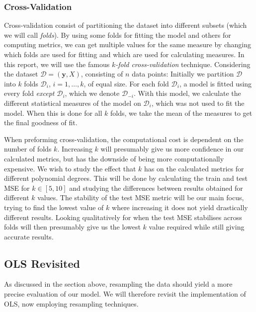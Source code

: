 \documentclass[twocolumn,english,notitlepage]{article}
\renewcommand{\vec}[1]{\boldsymbol{#1}}
\begin{document}
        \subsubsection{Cross-Validation}
            Cross-validation consist of partitioning the dataset into different subsets (which we will call \textit{folds}). By using some folds for fitting the model and others for computing metrics, we can get multiple values for the same measure by changing which folds are used for fitting and which are used for calculating measures. 
            \newline\newline
            In this report, we will use the famous \textit{$k$-fold cross-validation} technique. Considering the dataset $\mathcal{D} = (\vec{y}, X)$, consisting of $n$ data points: Initially we partition $\mathcal{D}$ into $k$ folds $\mathcal{D}_i$, $i = 1, \ldots , k$, of equal size. For each fold $\mathcal{D}_i$, a model is fitted using every fold \textit{except} $\mathcal{D}_i$, which we denote $\mathcal{D}_{-i}$. With this model, we calculate the different statistical measures of the model on $\mathcal{D}_i$, which was not used to fit the model. When this is done for all $k$ folds, we take the mean of the measures to get the final goodness of fit. 

            When preforming cross-validation, the computational cost is dependent on the number of folds $k$. Increasing $k$ will presumably give us more confidence in our calculated metrics, but has the downside of being more computationally expensive. We wish to study the effect that $k$ has on the calculated metrics for different polynomial degrees. This will be done by calculating the train and test MSE for $k \in [5,10]$ and studying the differences between results obtained for different  $k$ values. The stability of the test MSE metric will be our main focus, trying to find the lowest value of $k$ where increasing it does not yield drastically different results. Looking qualitatively for when the test MSE stabilises across folds will then presumably give us the lowest $k$ value required while still giving accurate results.

    \subsection{OLS Revisited}
        As discussed in the section above, resampling the data should yield a more precise evaluation of our model. We will therefore revisit the implementation of OLS, now employing resampling techniques. 
\end{document}
